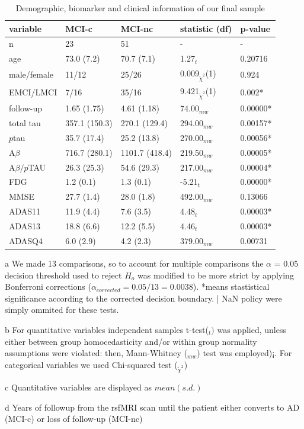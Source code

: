 \documentclass[a4paper,12pt]{elsarticle}  %
\begin{document}
		\begin{table}[h]
			\centering
			\begin{threeparttable}
				\caption{Demographic, biomarker and clinical information of our final sample}
				\label{table:demografics_biomarc_clinic_participants}
				\begin{tabular}{lllll}
					\toprule
					variable\tnote{c} & MCI-c & MCI-nc & statistic (df)\tnote{b} & p-value \\
					\midrule
					n & 23 & 51 & - & -\\
					age&73.0 (7.2)&70.7 (7.1)&1.27$_{t}$ &0.20716\\
					male/female& 11/12&25/26&0.009$_{\tilde{\chi}^2}$(1)&0.924\\
					EMCI/LMCI & 7/16 & 35/16  &  9.421$_{\tilde{\chi}^2}$(1)& 0.002*\\
					follow-up\tnote{d}&1.65 (1.75)&4.61 (1.18)&74.00$_{mw}$&0.00000*\\
					total tau&357.1 (150.3)&270.1 (129.4)&294.00$_{mw}$&  0.00157*\\
					$p$tau&35.7 (17.4)&25.2 (13.8)&270.00$_{mw}$ &  0.00056*\\
					A$\beta$&716.7 (280.1)&1101.7 (418.4)&219.50$_{mw}$ &  0.00005*\\
					A$\beta/p$TAU&26.3 (25.3)&54.6 (29.3)&217.00$_{mw}$ &  0.00004*\\
					FDG&1.2 (0.1)&1.3 (0.1)&-5.21$_{t}$&0.00000*\\
					MMSE&27.7 (1.4)&28.0 (1.8)&492.00$_{mw}$&0.13066\\
					ADAS11&11.9 (4.4)&7.6 (3.5)&4.48$_{t}$ &0.00003*\\
					ADAS13&18.8 (6.6)&12.2 (5.5)&4.46$_{t}$ &0.00003*\\
					ADASQ4& 6.0 (2.9)&4.2 (2.3)&379.00$_{mw}$ &0.00731\\
					\bottomrule
				\end{tabular}
				
				\begin{tablenotes}
					\item[a]{We made 13 comparisons, so to account for multiple comparisons the $\alpha$ = 0.05 decision threshold used to reject $H_{o}$ was modified to be more strict by applying Bonferroni corrections ($\alpha_{corrected} = 0.05/13 = 0.0038$). *means stastistical significance according to the corrected decision boundary. | NaN policy were simply ommited for these tests.}
					\item[b]{For quantitative variables independent samples t-test($_{t})$ was applied, unless either between group homocedasticity and/or within group normality assumptions were violated: then, Mann-Whitney ($_{mw}$) test was employed)¡. For categorical variables we used Chi-squared test ($_{\tilde{\chi}^2}$})
					\item[c]{Quantitative variables are displayed as $mean (s.d.)$}
					\item[d]{Years of followup from the rsfMRI scan until the patient either converts to AD (MCI-c) or loss of follow-up (MCI-nc)}
				\end{tablenotes}
			\end{threeparttable}
		\end{table}
		
\end{document}
